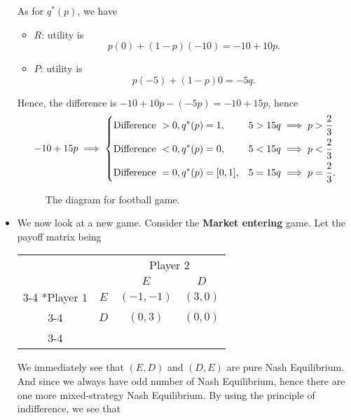 \begin{itemize}
	      As for \(q^{*}(p)\), we have
	      \begin{itemize}
		      \item \(R\): utility is
		            \[
			            p(0)+(1 - p)(-10)= -10 + 10p.
		            \]
		      \item \(P\): utility is
		            \[
			            p(-5)+(1 - p)0 = -5q.
		            \]
	      \end{itemize}
	      Hence, the difference is \(-10 + 10p - (-5p) = -10 + 15p\), hence
	      \[
		      -10 +15p\implies \begin{dcases}
			      \text{Difference }> 0, q^{*}(p) = 1,     & 5>15q \implies p>\frac{2}{3}  \\
			      \text{Difference }< 0, q^{*}(p) = 0,     & 5<15q \implies p<\frac{2}{3}  \\
			      \text{Difference }= 0, q^{*}(p) = [0,1], & 5=15q \implies p=\frac{2}{3}.
		      \end{dcases}
	      \]
	      \begin{figure}[H]
		      \centering
		      \caption{The diagram for football game.}
		      \label{fig:NE-football}
	      \end{figure}
	\item We now look at a new game. Consider the \textbf{Market entering} game. Let the payoff matrix being
	      \begin{table}[H]
		      \centering
		      \setlength{\extrarowheight}{2pt}
		      \begin{tabular}{cc|c|c|}
			                                & \multicolumn{1}{c}{} & \multicolumn{2}{c}{Player $2$}                           \\
			                                & \multicolumn{1}{c}{} & \multicolumn{1}{c}{$E$}        & \multicolumn{1}{c}{$D$} \\\cline{3-4}
			      \multirow{2}*{Player $1$} & $E$                  & $(-1, -1)$                     & $(3, 0)$                \\\cline{3-4}
			                                & $D$                  & $(0, 3)$                       & $(0, 0)$                \\\cline{3-4}
		      \end{tabular}
	      \end{table}
	      We immediately see that \((E, D)\) and \((D, E)\) are pure Nash Equilibrium. And since we always have odd number of Nash Equilibrium,
	      hence there are one more mixed-strategy Nash Equilibrium. By using the principle of indifference, we see that

\end{itemize}

